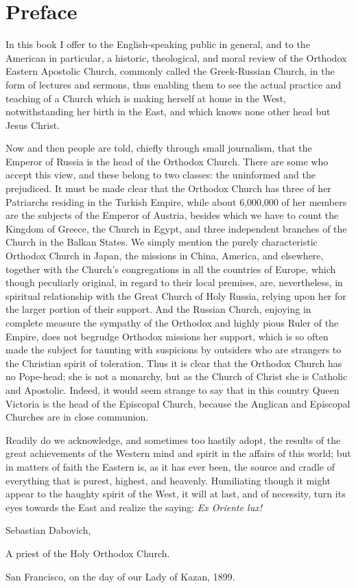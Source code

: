 \chapter{Preface}

In this book I offer to the English-speaking public in general, and to the American in particular, a historic, theological, and moral review of the Orthodox Eastern Apostolic Church, commonly called the Greek-Russian Church, in the form of lectures and sermons, thus enabling them to see the actual practice and teaching of a Church which is making herself at home in the West, notwithstanding her birth in the East, and which knows none other head but Jesus Christ.

Now and then people are told, chiefly through small journalism, that the Emperor of Russia is the head of the Orthodox Church. There are some who accept this view, and these belong to two classes: the uninformed and the prejudiced. It must be made clear that the Orthodox Church has three of her Patriarchs residing in the Turkish Empire, while about 6,000,000 of her members are the subjects of the Emperor of Austria, besides which we have to count the Kingdom of Greece, the Church in Egypt, and three independent branches of the Church in the Balkan States. We simply mention the purely characteristic Orthodox Church in Japan, the missions in China, America, and elsewhere, together with the Church's congregations in all the countries of Europe, which though peculiarly original, in regard to their local premises, are, nevertheless, in spiritual relationship with the Great Church of Holy Russia, relying upon her for the larger portion of their support. And the Russian Church, enjoying in complete measure the sympathy of the Orthodox and highly pious Ruler of the Empire, does not begrudge Orthodox missions her support, which is so often made the subject for taunting with suspicions by outsiders who are strangers to the Christian spirit of toleration. Thus it is clear that the Orthodox Church has no Pope-head; she is not a monarchy, but as the Church of Christ she is Catholic and Apostolic. Indeed, it would seem strange to say that in this country Queen Victoria is the head of the Episcopal Church, because the Anglican and Episcopal Churches are in close communion.

Readily do we acknowledge, and sometimes too hastily adopt, the results of the great achievements of the Western mind and spirit in the affairs of this world; but in matters of faith the Eastern is, as it has ever been, the source and cradle of everything that is purest, highest, and heavenly. Humiliating though it might appear to the haughty spirit of the West, it will at last, and of necessity, turn its eyes towards the East and realize the saying: \textit{Ex Oriente lux!}

Sebastian Dabovich,

A priest of the Holy Orthodox Church.

San Francisco, on the day of our Lady of Kazan, 1899.
